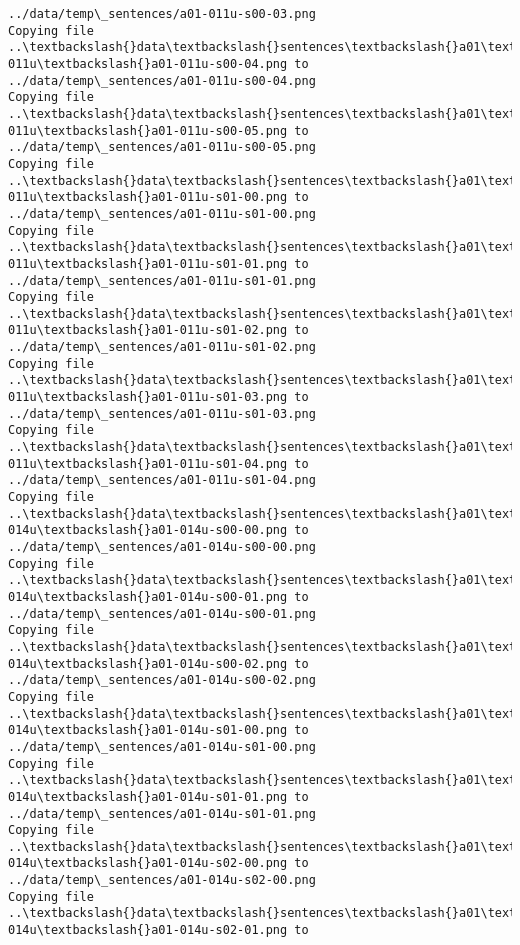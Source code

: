 \documentclass[11pt]{article}
\begin{document}
\begin{Verbatim}[commandchars=\\\{\}]
../data/temp\_sentences/a01-011u-s00-03.png
Copying file ..\textbackslash{}data\textbackslash{}sentences\textbackslash{}a01\textbackslash{}a01-011u\textbackslash{}a01-011u-s00-04.png to
../data/temp\_sentences/a01-011u-s00-04.png
Copying file ..\textbackslash{}data\textbackslash{}sentences\textbackslash{}a01\textbackslash{}a01-011u\textbackslash{}a01-011u-s00-05.png to
../data/temp\_sentences/a01-011u-s00-05.png
Copying file ..\textbackslash{}data\textbackslash{}sentences\textbackslash{}a01\textbackslash{}a01-011u\textbackslash{}a01-011u-s01-00.png to
../data/temp\_sentences/a01-011u-s01-00.png
Copying file ..\textbackslash{}data\textbackslash{}sentences\textbackslash{}a01\textbackslash{}a01-011u\textbackslash{}a01-011u-s01-01.png to
../data/temp\_sentences/a01-011u-s01-01.png
Copying file ..\textbackslash{}data\textbackslash{}sentences\textbackslash{}a01\textbackslash{}a01-011u\textbackslash{}a01-011u-s01-02.png to
../data/temp\_sentences/a01-011u-s01-02.png
Copying file ..\textbackslash{}data\textbackslash{}sentences\textbackslash{}a01\textbackslash{}a01-011u\textbackslash{}a01-011u-s01-03.png to
../data/temp\_sentences/a01-011u-s01-03.png
Copying file ..\textbackslash{}data\textbackslash{}sentences\textbackslash{}a01\textbackslash{}a01-011u\textbackslash{}a01-011u-s01-04.png to
../data/temp\_sentences/a01-011u-s01-04.png
Copying file ..\textbackslash{}data\textbackslash{}sentences\textbackslash{}a01\textbackslash{}a01-014u\textbackslash{}a01-014u-s00-00.png to
../data/temp\_sentences/a01-014u-s00-00.png
Copying file ..\textbackslash{}data\textbackslash{}sentences\textbackslash{}a01\textbackslash{}a01-014u\textbackslash{}a01-014u-s00-01.png to
../data/temp\_sentences/a01-014u-s00-01.png
Copying file ..\textbackslash{}data\textbackslash{}sentences\textbackslash{}a01\textbackslash{}a01-014u\textbackslash{}a01-014u-s00-02.png to
../data/temp\_sentences/a01-014u-s00-02.png
Copying file ..\textbackslash{}data\textbackslash{}sentences\textbackslash{}a01\textbackslash{}a01-014u\textbackslash{}a01-014u-s01-00.png to
../data/temp\_sentences/a01-014u-s01-00.png
Copying file ..\textbackslash{}data\textbackslash{}sentences\textbackslash{}a01\textbackslash{}a01-014u\textbackslash{}a01-014u-s01-01.png to
../data/temp\_sentences/a01-014u-s01-01.png
Copying file ..\textbackslash{}data\textbackslash{}sentences\textbackslash{}a01\textbackslash{}a01-014u\textbackslash{}a01-014u-s02-00.png to
../data/temp\_sentences/a01-014u-s02-00.png
Copying file ..\textbackslash{}data\textbackslash{}sentences\textbackslash{}a01\textbackslash{}a01-014u\textbackslash{}a01-014u-s02-01.png to

\end{Verbatim}
\end{document}
